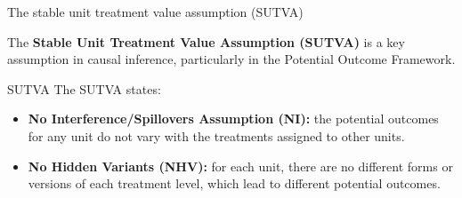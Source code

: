 \documentclass[aspectratio=169]{beamer}
\begin{document}
\begin{frame}{The stable unit treatment value assumption (SUTVA)}

The \textbf{Stable Unit Treatment Value Assumption (SUTVA)} is a key assumption in causal inference, particularly in the Potential Outcome Framework.

    \begin{coolblock}{SUTVA}
        The SUTVA states:
        \begin{itemize}
            \item \textbf{No Interference/Spillovers Assumption (NI):} the potential outcomes for any unit do not vary with the treatments assigned to other units.
            
            \item \textbf{No Hidden Variants (NHV):} for each unit, there are no different forms or versions of each treatment level, which lead to different potential outcomes.
        \end{itemize}
    \end{coolblock}
    \vspace{0.4cm}

\end{frame}
\end{document}
